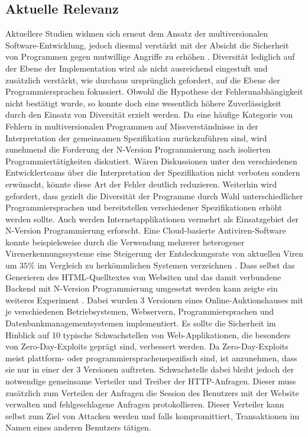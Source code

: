 \subsection{Aktuelle Relevanz}\label{bewertung-relevanz}
Aktuellere Studien widmen sich erneut dem Ansatz der multiversionalen Software-Entwicklung, jedoch diesmal verstärkt mit der Absicht die Sicherheit von Programmen gegen mutwillige Angriffe zu erhöhen \cite{current-challenges}. Diversität lediglich auf der Ebene der Implementation wird als nicht ausreichend eingestuft und zusätzlich verstärkt, wie durchaus ursprünglich gefordert, auf die Ebene der Programmiersprachen fokussiert. Obwohl die Hypothese der Fehlerunabhängigkeit nicht bestätigt wurde, so konnte doch eine wesentlich höhere Zuverlässigkeit durch den Einsatz von Diversität erzielt werden.
Da eine häufige Kategorie von Fehlern in multiversionalen Programmen auf Missverständnisse in der Interpretation der gemeinsamen Spezifikation zurückzuführen sind, wird zunehmend die Forderung der N-Version Programmierung nach isolierten Programmiertätigkeiten diskutiert. Wären Diskussionen unter den verschiedenen Entwicklerteams über die Interpretation der Spezifikation nicht verboten sondern erwünscht, könnte diese Art der Fehler deutlich reduzieren. Weiterhin wird gefordert, dass gezielt die Diversität der Programme durch Wahl unterschiedlicher Programmiersprachen und bereitstellen verschiedener Spezifikationen erhöht werden sollte. 
Auch werden Internetapplikationen vermehrt als Einsatzgebiet der N-Version Programmierung erforscht. Eine Cloud-basierte Antiviren-Software konnte beispielsweise durch die Verwendung mehrerer heterogener Virenerkennungssysteme eine Steigerung der Entdeckungsrate von aktuellen Viren um $35\%$ im Vergleich zu herkömmlichen Systemen verzeichnen \cite{Oberheide:2008:CNA:1496711.1496718}. Dass selbst das Generieren des HTML-Quelltextes von Websiten und das damit verbundene Backend mit N-Version Programmierung umgesetzt werden kann zeigte ein weiteres Experiment \cite{zero-day}. 
Dabei wurden 3 Versionen eines Online-Auktionshauses mit je verschiedenen Betriebsystemen, Webservern, Programmiersprachen und Datenbankmanagementsystemen implementiert. Es sollte die Sicherheit im Hinblick auf 10 typische Schwachstellen von Web-Applikationen, die besonders von Zero-Day-Exploits geprägt sind, verbessert werden. Da Zero-Day-Exploits meist plattform- oder programmiersprachenspezifisch sind, ist anzunehmen, dass sie nur in einer der 3 Versionen auftreten. Schwachstelle dabei bleibt jedoch der notwendige gemeinsame Verteiler und Treiber der HTTP-Anfragen. Dieser muss zusätzlich zum Verteilen der Anfragen die Session des Benutzers mit der Website verwalten und fehlgeschlagene Anfragen protokollieren.
Dieser Verteiler kann selbst zum Ziel von Attacken werden und falls kompromittiert, Transaktionen im Namen eines anderen Benutzers tätigen.
